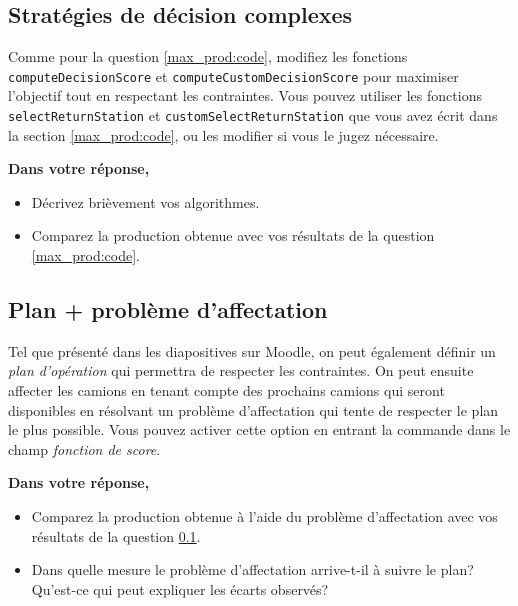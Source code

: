 \subsection{Stratégies de décision complexes}
\label{max_cont:code}
Comme pour la question \ref{max_prod:code}, modifiez les fonctions  \verb!computeDecisionScore! et \verb!computeCustomDecisionScore! pour maximiser l'objectif tout en respectant les contraintes. Vous pouvez utiliser les fonctions \verb!selectReturnStation! et \verb!customSelectReturnStation! que vous avez écrit dans la section \ref{max_prod:code}, ou les modifier si vous le jugez nécessaire.

\vspace{10pt} 
\noindent\textbf{Dans votre réponse,}  

\begin{itemize}
	\item Décrivez brièvement vos algorithmes. 
	\item Comparez la production obtenue avec vos résultats de la question \ref{max_prod:code}.
\end{itemize}



\subsection{Plan + problème d'affectation}

Tel que présenté dans les diapositives sur Moodle, on peut également définir un \textit{plan d'opération} qui permettra de respecter les contraintes. On peut ensuite affecter les camions en tenant compte des prochains camions qui seront disponibles en résolvant un problème d'affectation qui tente de respecter le plan le plus possible. Vous pouvez activer cette option en entrant la commande  dans le champ \textit{fonction de score}.

\vspace{10pt}
\noindent\textbf{Dans votre réponse,}  

\begin{itemize}
	\item Comparez la production obtenue à l'aide du problème d'affectation avec vos résultats de la question \ref{max_cont:code}.
	\item Dans quelle mesure le problème d'affectation arrive-t-il à suivre le plan? Qu'est-ce qui peut expliquer les écarts observés? 
\end{itemize}



